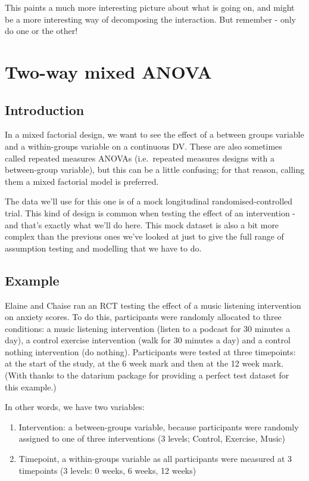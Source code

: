 \documentclass[
]{book}
\providecommand{\tightlist}{%
  \setlength{\itemsep}{0pt}\setlength{\parskip}{0pt}}
\begin{document}
This paints a much more interesting picture about what is going on, and might be a more interesting way of decomposing the interaction. But remember - only do one or the other!

\section{Two-way mixed ANOVA}\label{two-way-mixed-anova}

\subsection{Introduction}\label{introduction-2}

In a mixed factorial design, we want to see the effect of a between groups variable and a within-groups variable on a continuous DV. These are also sometimes called repeated measures ANOVAs (i.e.~repeated measures designs with a between-group variable), but this can be a little confusing; for that reason, calling them a mixed factorial model is preferred.

The data we'll use for this one is of a mock longitudinal randomised-controlled trial. This kind of design is common when testing the effect of an intervention - and that's exactly what we'll do here. This mock dataset is also a bit more complex than the previous ones we've looked at just to give the full range of assumption testing and modelling that we have to do.

\subsection{Example}\label{example-4}

Elaine and Chaise ran an RCT testing the effect of a music listening intervention on anxiety scores. To do this, participants were randomly allocated to three conditions: a music listening intervention (listen to a podcast for 30 minutes a day), a control exercise intervention (walk for 30 minutes a day) and a control nothing intervention (do nothing). Participants were tested at three timepoints: at the start of the study, at the 6 week mark and then at the 12 week mark. (With thanks to the datarium package for providing a perfect test dataset for this example.)

In other words, we have two variables:

\begin{enumerate}
\def\labelenumi{\arabic{enumi}.}
\tightlist
\item
  Intervention: a between-groups variable, because participants were randomly assigned to one of three interventions (3 levels; Control, Exercise, Music)
\item
  Timepoint, a within-groups variable as all participants were measured at 3 timepoints (3 levels: 0 weeks, 6 weeks, 12 weeks)
\end{enumerate}
\end{document}
